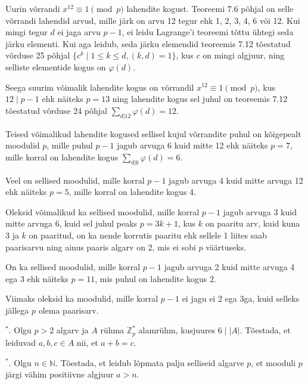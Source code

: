 \documentclass[a4paper, 10pt]{article}
\newcommand{\Z}{\mathbb{Z}}
\newcommand{\N}{\mathbb{N}}
\begin{document}
Uurin võrrandi $x^{12}\equiv1\pmod p$ lahendite kogust. Teoreemi 7.6 põhjal on selle võrrandi lahendid arvud, mille järk on arvu 12 tegur ehk 1, 2, 3, 4, 6 või 12. Kui mingi tegur $d$ ei jaga arvu $p-1$, ei leidu Lagrange'i teoreemi tõttu ühtegi seda järku elementi. Kui aga leidub, seda järku elemendid teoreemis 7.12 tõestatud võrduse 25 põhjal $\{c^k\mid 1\leq k\leq d, (k,d)=1\}$, kus $c$ on mingi algjuur, ning selliste elementide kogus on $\varphi(d)$.

Seega suurim võimalik lahendite kogus on võrrandil $x^{12}\equiv1\pmod p$, kus $12\mid p-1$ ehk näiteks $p=13$ ning lahendite kogus sel juhul on teoreemis 7.12 tõestatud võrduse 24 põhjal $\sum_{d|12}\varphi(d)=12$.

Teised võimalikud lahendite kogused sellisel kujul võrrandite puhul on kõigepealt moodulid $p$, mille puhul $p-1$ jagub arvuga 6 kuid mitte 12 ehk näiteks $p=7$, mille korral on lahendite kogus $\sum_{d|6}\varphi(d)=6$.

Veel on sellised moodulid, mille korral $p-1$ jagub arvuga 4 kuid mitte arvuga 12 ehk näiteks $p=5$, mille korral on lahendite kogus 4.

Oleksid võimalikud ka sellised moodulid, mille korral $p-1$ jagub arvuga 3 kuid mitte arvuga 6, kuid sel juhul peaks $p=3k+1$, kus $k$ on paaritu arv, kuid kuna 3 ja $k$ on paaritud, on ka nende korrutis paaritu ehk sellele 1 liites saab paarisarvu ning ainus paaris algarv on 2, mis ei sobi $p$ väärtuseks.

On ka sellised moodulid, mille korral $p-1$ jagub arvuga 2 kuid mitte arvuga 4 ega 3 ehk näiteks $p=11$, mis puhul on lahendite kogus 2.

Viimaks oleksid ka moodulid, mille korral $p-1$ ei jagu ei 2 ega 3ga, kuid selleks jällega $p$ olema paarisarv.


\bigskip

${^*}$. Olgu $p>2$ algarv ja $A$ rühma $\Z_p^*$ alamrühm, kusjuures $6\mid |A|$. Tõestada, et leiduvad $a,b,c\in A$ nii, et $a+b=c$. 

\bigskip

${^{*}}$. Olgu $n\in\N$. Tõestada, et leidub lõpmata palju selliseid algarve $p$, et mooduli $p$ järgi vähim positiivne algjuur $a>n$.
\end{document}
